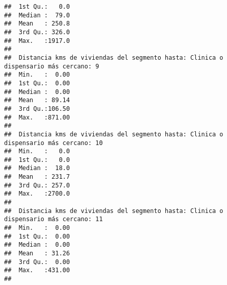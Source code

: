 \documentclass[11pt,]{article}
\begin{document}
\begin{verbatim}
##  1st Qu.:   0.0                                                                     
##  Median :  79.0                                                                     
##  Mean   : 250.8                                                                     
##  3rd Qu.: 326.0                                                                     
##  Max.   :1917.0                                                                     
##                                                                                     
##  Distancia kms de viviendas del segmento hasta: Clinica o dispensario más cercano: 9
##  Min.   :  0.00                                                                     
##  1st Qu.:  0.00                                                                     
##  Median :  0.00                                                                     
##  Mean   : 89.14                                                                     
##  3rd Qu.:106.50                                                                     
##  Max.   :871.00                                                                     
##                                                                                     
##  Distancia kms de viviendas del segmento hasta: Clinica o dispensario más cercano: 10
##  Min.   :   0.0                                                                      
##  1st Qu.:   0.0                                                                      
##  Median :  18.0                                                                      
##  Mean   : 231.7                                                                      
##  3rd Qu.: 257.0                                                                      
##  Max.   :2700.0                                                                      
##                                                                                      
##  Distancia kms de viviendas del segmento hasta: Clinica o dispensario más cercano: 11
##  Min.   :  0.00                                                                      
##  1st Qu.:  0.00                                                                      
##  Median :  0.00                                                                      
##  Mean   : 31.26                                                                      
##  3rd Qu.:  0.00                                                                      
##  Max.   :431.00                                                                      
##                                                                                      

\end{verbatim}
\end{document}
